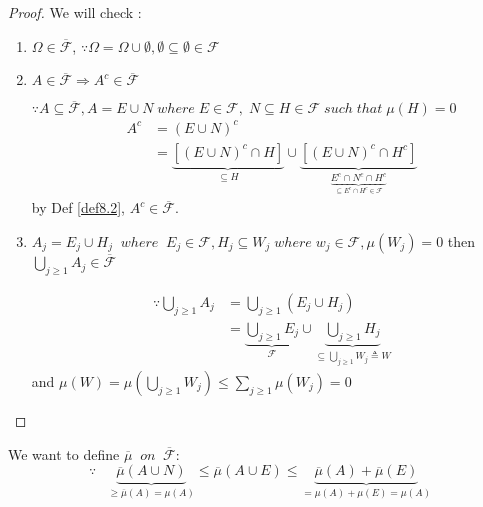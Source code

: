  \begin{proof}
 	We will check :
 	\begin{enumerate}
 		\item $ \Omega \in \overline {\mathcal{F}} $,  $\because \Omega  = \Omega  \cup \emptyset ,\emptyset  \subseteq \emptyset  \in \mathcal{F}$
 		\item $ A \in \overline {\mathcal{F}} \Rightarrow A^{c} \in \overline {\mathcal{F}} $
 		
 		$\because A \subseteq \overline {\mathcal{F}} ,A = E \cup N\;where\;E \in \mathcal{F},\;N \subseteq H \in \mathcal{F}\;such\;that\;\mu \left( H \right) = 0$
 		\begin{equation}
 		\begin{split}
 		{A^c} & = {\left( {E \cup N} \right)^c}\\
 		      & = \underbrace {\left[ {{{\left( {E \cup N} \right)}^c} \cap H} \right]}_{ \subseteq H} \cup \underbrace {\left[ {{{\left( {E \cup N} \right)}^c} \cap {H^c}} \right]}_{\underbrace {{E^c} \cap {N^c} \cap {H^c}}_{ \subseteq {E^c} \cap {H^c} \in \mathcal{F}}}
 		\end{split}
 		\label{eq8.1}
 		\end{equation}
 		by Def \ref{def8.2}, $ A^{c} \in \overline {\mathcal{F}}. $
 		\item ${A_j} = {E_j} \cup {H_j}\;\;where\;\;{E_j} \in \mathcal{F},{H_j} \subseteq {W_j}\;where\;{w_j} \in \mathcal{F},\mu \left( {{W_j}} \right) = 0$ then $\bigcup\limits_{j \geqslant 1} {{A_j}}  \in \overline {\mathcal{F}} $
 		
 		\begin{equation}
 		\begin{split}
 		\because \bigcup\limits_{j \geqslant 1} {{A_j}}  & = \bigcup\limits_{j \geqslant 1} {\left( {{E_j} \cup {H_j}} \right)} \\
 												& = \underbrace {\bigcup\limits_{j \geqslant 1} {{E_j}} }_{\mathcal{F}} \cup \underbrace {\bigcup\limits_{j \geqslant 1} {{H_j}} }_{ \subseteq \bigcup\limits_{j \geqslant 1} {{W_j}}  \triangleq W}
 		\end{split}
 		\label{eq8.2}
 		\end{equation}
 		and $\mu \left( W \right) = \mu \left( {\bigcup\limits_{j \geqslant 1} {{W_j}} } \right) \leqslant \sum\limits_{j \geqslant 1} {\mu \left( {{W_j}} \right)}  = 0$
 	\end{enumerate}
 \end{proof}

We want to define $\overline \mu  \;\;on\;\;\overline {\mathcal{F}}: $
\begin{equation}
\because \;\;\;\underbrace {\overline \mu  \left( {A \cup N} \right)}_{ \geqslant \overline \mu  \left( A \right) = \mu \left( A \right)} \leqslant \overline \mu  \left( {A \cup E} \right) \leqslant \underbrace {\overline \mu  \left( A \right) + \overline \mu  \left( E \right)}_{ = \mu \left( A \right) + \mu \left( E \right) = \mu \left( A \right)}
\label{eq8.3}
\end{equation}

